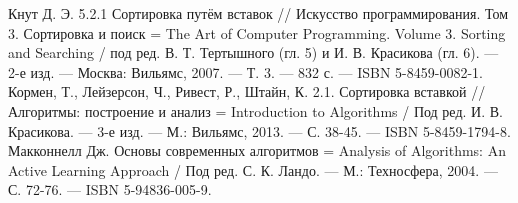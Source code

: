 \documentclass[a4paper, 14pt]{article}
\begin{document}
\newpage
{}

\begin{thebibliography}{11} 
    Кнут Д. Э. 5.2.1 Сортировка путём вставок // Искусство программирования. Том 3. Сортировка и поиск = The Art of Computer Programming. Volume 3. Sorting and Searching / под ред. В. Т. Тертышного (гл. 5) и И. В. Красикова (гл. 6). — 2-е изд. — Москва: Вильямс, 2007. — Т. 3. — 832 с. — ISBN 5-8459-0082-1.
    Кормен, Т., Лейзерсон, Ч., Ривест, Р., Штайн, К. 2.1. Сортировка вставкой // Алгоритмы: построение и анализ = Introduction to Algorithms / Под ред. И. В. Красикова. — 3-е изд. — М.: Вильямс, 2013. — С. 38-45. — ISBN 5-8459-1794-8.
      Макконнелл Дж. Основы современных алгоритмов = Analysis of Algorithms: An Active Learning Approach / Под ред. С. К. Ландо. — М.: Техносфера, 2004. — С. 72-76. — ISBN 5-94836-005-9.
    
    \end{thebibliography}
	\newpage
	
	
	
\end{document}
